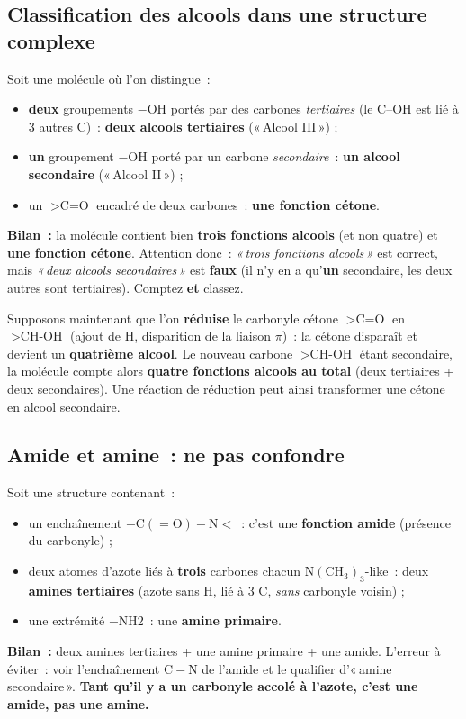 \documentclass[11pt,a4paper]{article}
\begin{document}
\subsection{Classification des alcools dans une structure complexe}
\begin{exemple}
Soit une molécule où l'on distingue~:
\begin{itemize}[leftmargin=1.6em,itemsep=1pt]
  \item \textbf{deux} groupements $-\text{OH}$ portés par des carbones \emph{tertiaires} (le C--OH est lié à 3 autres C)~: \textbf{deux alcools tertiaires} («\,Alcool III\,») ;
  \item \textbf{un} groupement $-\text{OH}$ porté par un carbone \emph{secondaire}~: \textbf{un alcool secondaire} («\,Alcool II\,») ;
  \item un $>\text{C=O}$ encadré de deux carbones~: \textbf{une fonction cétone}.
\end{itemize}
\textbf{Bilan~:} la molécule contient bien \textbf{trois fonctions alcools} (et non quatre) et \textbf{une fonction cétone}. Attention donc~: \emph{«\,trois fonctions alcools\,»} est correct, mais \emph{«\,deux alcools secondaires\,»} est \textbf{faux} (il n'y en a qu'\textbf{un} secondaire, les deux autres sont tertiaires). Comptez \textbf{et} classez.

\medskip
Supposons maintenant que l'on \textbf{réduise} le carbonyle cétone $>\text{C=O}$ en $>\text{CH-OH}$ (ajout de H, disparition de la liaison $\pi$)~: la cétone disparaît et devient un \textbf{quatrième alcool}. Le nouveau carbone $>\text{CH-OH}$ étant secondaire, la molécule compte alors \textbf{quatre fonctions alcools au total} (deux tertiaires + deux secondaires). Une réaction de réduction peut ainsi transformer une cétone en alcool secondaire.
\end{exemple}

\subsection{Amide et amine~: ne pas confondre}
\begin{exemple}
Soit une structure contenant~:
\begin{itemize}[leftmargin=1.6em,itemsep=1pt]
  \item un enchaînement $\mathrm{-C(=O)-N<}$~: c'est une \textbf{fonction amide} (présence du carbonyle) ;
  \item deux atomes d'azote liés à \textbf{trois} carbones chacun $\mathrm{N(CH_3)_3}$-like~: deux \textbf{amines tertiaires} (azote sans H, lié à 3 C, \emph{sans} carbonyle voisin) ;
  \item une extrémité $\mathrm{-NH2}$~: une \textbf{amine primaire}.
\end{itemize}
\textbf{Bilan~:} deux amines tertiaires + une amine primaire + une amide. L'erreur à éviter~: voir l'enchaînement $\mathrm{C-N}$ de l'amide et le qualifier d'«\,amine secondaire\,». \textbf{Tant qu'il y a un carbonyle accolé à l'azote, c'est une amide, pas une amine.}
\end{exemple}
\end{document}
